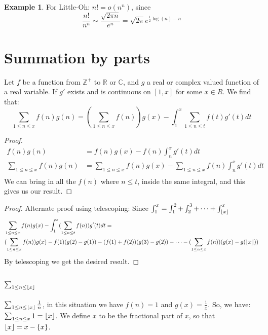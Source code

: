 \documentclass{article}
\newcommand{\Z}{\mathbb{Z}}
\newcommand{\C}{\mathbb{C}}
\newcommand{\R}{\mathbb{R}}
\DeclarePairedDelimiter\floor{\lfloor}{\rfloor}
\theoremstyle{definition}
\theoremstyle{remark}
\theoremstyle{definition}
\newtheorem{example}{Example}[definition]
\begin{document}
	\begin{example} For Little-Oh: $n! = o(n^n)$, since \begin{equation*}
			\frac{n!}{n^n} \sim \frac{\sqrt{2\pi n}}{e^n} = \sqrt{2\pi}e^{\frac{1}{2}\log(n) - n}
		\end{equation*}
	\end{example}
\section{Summation by parts}
Let $f$ be a function from $\Z^+$ to $\R$ or $\C$, and $g$ a real or complex valued function of a real variable. If $g'$ exists and is continuous on $[1,x]$ for some $x\in R$. We find that:\begin{equation}
	\sum_{1\leq n \leq x} f(n)g(n) = (\sum_{1\leq n\leq x}f(n))g(x) - \int_1^x \sum_{1\leq n\leq t}f(t)g'(t)dt
\end{equation}
\begin{proof}
	\begin{align*}
		f(n)g(n) &= f(n)g(x) - f(n)\int_{n}^x g'(t)dt\\
		\sum_{1\leq n\leq x}f(n)g(n)&= \sum_{1\leq n\leq x}f(n)g(x) - \sum_{1\leq n\leq x}f(n)\int_{n}^x g'(t)dt\\
	\end{align*}
	We can bring in all the $f(n)$ where $n\leq t$, inside the same integral, and this gives us our result.
\end{proof}
\begin{proof}
	Alternate proof using telescoping:
		Since $\int_1^x = \int_1^2 + \int_2^3+\cdots + \int_{\floor*{x}}^x$
	  \begin{align*}
	  	&\sum_{1\leq n\leq x}f(n)g(x) - \int_1^x (\sum_{1\leq n \leq t}f(n))g'(t)dt = \\
	  	&(\sum_{1\leq n\leq x}f(n))g(x) - f(1)(g(2)-g(1)) - (f(1) + f(2))(g(3) - g(2)) - \cdots - (\sum_{1\leq n\leq x}f(n))(g(x) - g(\floor{x}))
	  \end{align*}
	  By telescoping we get the desired result.
\end{proof}
\subsection{$\sum_{1\leq n\leq \floor*{x}}$}

	$\sum_{1\leq n\leq \floor*{x}} \frac{1}{n}$, in this situation we have $f(n) = 1$ and $g(x) = \frac{1}{x}$. So, we have: $\sum_{1\leq n \leq x} 1 = \floor{x}$. We define ${x}$ to be the fractional part of $x$, so that $\floor{x} = x - \{x\}$.
	
\end{document}
